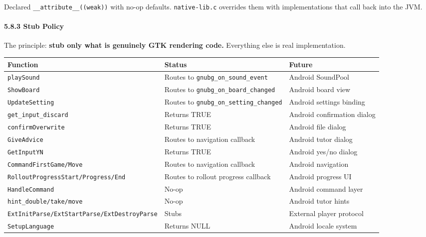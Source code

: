 \documentclass[11pt,a4paper]{article}
\begin{document}
Declared \texttt{\_\_attribute\_\_((weak))} with no-op defaults.
\texttt{native-lib.c} overrides them with implementations that call back
into the JVM.

\paragraph{5.8.3 Stub Policy}\label{stub-policy}

The principle: \textbf{stub only what is genuinely GTK rendering code.}
Everything else is real implementation.

\begin{longtable}[]{@{}
  >{\raggedright\arraybackslash}p{}
  >{\raggedright\arraybackslash}p{}
  >{\raggedright\arraybackslash}p{}@{}}
\toprule\noalign{}
\begin{minipage}[b]{\linewidth}\raggedright
Function
\end{minipage} & \begin{minipage}[b]{\linewidth}\raggedright
Status
\end{minipage} & \begin{minipage}[b]{\linewidth}\raggedright
Future
\end{minipage} \\
\midrule\noalign{}
\endhead
\bottomrule\noalign{}
\endlastfoot
\texttt{playSound} & Routes to \texttt{gnubg\_on\_sound\_event} &
Android SoundPool \\
\texttt{ShowBoard} & Routes to \texttt{gnubg\_on\_board\_changed} &
Android board view \\
\texttt{UpdateSetting} & Routes to \texttt{gnubg\_on\_setting\_changed}
& Android settings binding \\
\texttt{get\_input\_discard} & Returns TRUE & Android confirmation
dialog \\
\texttt{confirmOverwrite} & Returns TRUE & Android file dialog \\
\texttt{GiveAdvice} & Routes to navigation callback & Android tutor
dialog \\
\texttt{GetInputYN} & Returns TRUE & Android yes/no dialog \\
\texttt{CommandFirstGame/Move} & Routes to navigation callback & Android
navigation \\
\texttt{RolloutProgressStart/Progress/End} & Routes to rollout progress
callback & Android progress UI \\
\texttt{HandleCommand} & No-op & Android command layer \\
\texttt{hint\_double/take/move} & No-op & Android tutor hints \\
\texttt{ExtInitParse/ExtStartParse/ExtDestroyParse} & Stubs & External
player protocol \\
\texttt{SetupLanguage} & Returns NULL & Android locale system \\
\end{longtable}
\end{document}

